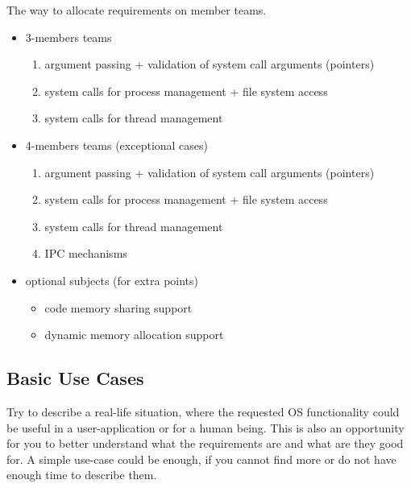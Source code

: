 The way to allocate requirements on member teams. 
\begin{itemize}
    \item 3-members teams
        \begin{enumerate}
            \item argument passing + validation of system call arguments (pointers)
            
            \item system calls for process management + file system access
            
            \item system calls for thread management
            
        \end{enumerate}

    \item 4-members teams (exceptional cases)
        \begin{enumerate}
            \item argument passing + validation of system call arguments (pointers)
            
            \item system calls for process management + file system access
            
            \item system calls for thread management
            
            \item IPC mechanisms
        \end{enumerate}

     \item optional subjects (for extra points)
        \begin{itemize}
            \item code memory sharing support
            \item dynamic memory allocation support
        \end{itemize}

\end{itemize}


\subsection{Basic Use Cases}

Try to describe a real-life situation, where the requested OS functionality could be useful in a user-application or for a human being. This is also an opportunity for you to better understand what the requirements are and what are they good for. A simple use-case could be enough, if you cannot find more or do not have enough time to describe them.


